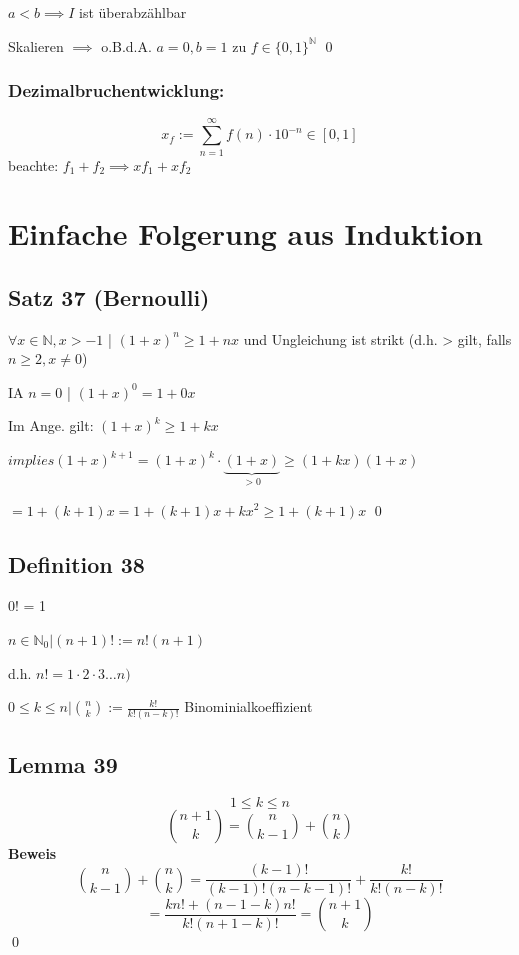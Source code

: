 \documentclass[fleqn]{scrbook}
\renewenvironment{proof}{{\bfseries Beweis }}{\qed}
\begin{document}
$a < b \implies I$ ist überabzählbar

\begin{proof}
Skalieren $\implies$ o.B.d.A. $a = 0, b = 1$ zu $f \in \{0,1\}^\mathbb{N}$
\end{proof}
\subsubsection{Dezimalbruchentwicklung:} \[x_f := \sum_{n = 1}^\infty f(n)  \cdot  10^{-n} \in [0,1]\]
beachte: $f_1 + f_2 \implies xf_1 + xf_2$
\section{Einfache Folgerung aus Induktion}
\subsection{Satz 37 (Bernoulli)}
$\forall x \in \mathbb{N}, x > -1$ | $(1+x)^n \geq 1 + nx$ und Ungleichung ist strikt (d.h. > gilt, falls $n \geq 2, x \neq 0$)

\begin{proof}
	IA $n = 0$ | $(1 + x)^0 = 1 + 0x$
	
	Im Ange. gilt: $(1 + x)^k \geq 1 + k x$
	
	$implies (1 + x)^{k + 1} = (1 + x)^k  \cdot  \underbrace{(1 + x)}_{> 0} \geq (1 + kx) (1 + x)$
	
	$= 1 + (k + 1)x = 1 + (k + 1)x + k x^2 \geq 1 + (k + 1)x$
\end{proof}
\subsection{Definition 38} 0! = 1

	$n \in \mathbb{N}_0 | (n + 1)! := n!(n+1)$
	
	d.h. $n! = 1  \cdot  2  \cdot  3 \ldots n)$
	
	$0 \leq k \leq n | \binom{n}{k} := \frac{k!}{k!(n-k)!}$ Binominialkoeffizient
\subsection{Lemma 39} \[1 \leq k \leq n\] \[\binom{n+1}{k} = \binom {n}{k-1} + \binom{n}{k}\]
\begin{proof}
	\[ \binom {n}{k-1} + \binom{n}{k} = \frac{(k-1)!}{(k-1)!(n-k-1)!} + \frac{k!}{k!(n-k)!}\]
	\[ = \frac{kn! + (n -1 -k)n!}{k!(n+1-k)!} = \binom{n+1}{k}\]
\end{proof}
\end{document}
